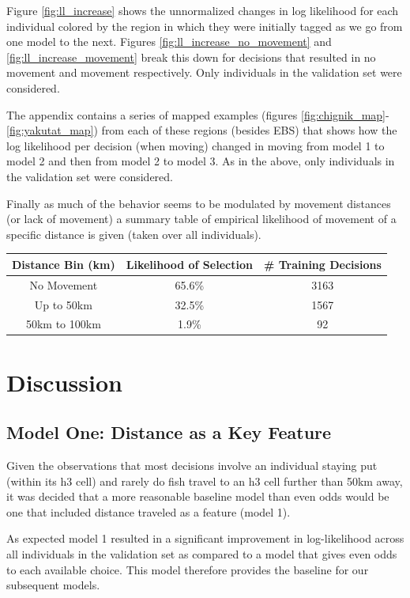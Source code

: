 \documentclass[11pt]{article}
\begin{document}
Figure \ref{fig:ll_increase} shows the unnormalized changes in log likelihood for each individual colored by the region in which they were initially tagged as we go from one model to the next. Figures \ref{fig:ll_increase_no_movement} and \ref{fig:ll_increase_movement} break this down for decisions that resulted in no movement and movement respectively. Only individuals in the validation set were considered.

The appendix contains a series of mapped examples (figures \ref{fig:chignik_map}-\ref{fig:yakutat_map}) from each of these regions (besides EBS) that shows how the log likelihood per decision (when moving) changed in moving from model 1 to model 2 and then from model 2 to model 3. As in the above, only individuals in the validation set were considered.\newline

Finally as much of the behavior seems to be modulated by movement distances (or lack of movement) a summary table of empirical likelihood of movement of a specific distance is given (taken over all individuals). 

\begin{center}
\begin{tabular}{| c | c | c |}
\hline
Distance Bin (km) & Likelihood of Selection & \# Training Decisions \\
\hline
No Movement & 65.6\% & 3163 \\
Up to 50km & 32.5\% & 1567 \\
50km to 100km & 1.9\% & 92 \\
\hline

\end{tabular}
\end{center}


\section*{Discussion}

\subsection*{Model One: Distance as a Key Feature}
Given the observations that most decisions involve an individual staying put (within its h3 cell) and rarely do fish travel to an h3 cell further than 50km away, it was decided that a more reasonable baseline model than even odds would be one that included distance traveled as a feature (model 1). 

As expected model 1 resulted in a significant improvement in log-likelihood across all individuals in the validation set as compared to a model that gives even odds to each available choice. This model therefore provides the baseline for our subsequent models. 
\end{document}
